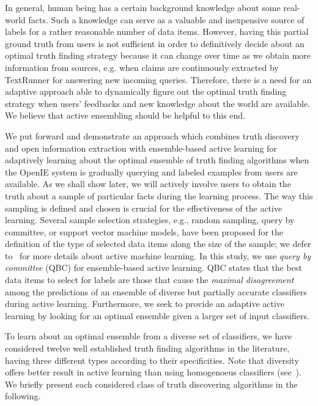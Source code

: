 In general, human being has a certain background knowledge about some real-world facts. Such a knowledge can serve as a valuable and inexpensive source of labels for a 
rather reasonable number of data items. However, having this partial ground truth from users is not sufficient in order to definitively decide about an optimal truth
finding strategy because it can change over time as we obtain more information from sources, e.g. when claims are continuously extracted by TextRunner for answering
new incoming queries. Therefore, there is a need for an adaptive approach able to dynamically figure out the optimal truth finding strategy when users' feedbacks and 
new knowledge about the world are available. We believe that active ensembling should be helpful to this end.

We put forward and demonstrate an approach which combines truth discovery and open information extraction with ensemble-based active learning for adaptively learning about the optimal 
ensemble of truth finding algorithms when the OpenIE system is gradually querying and labeled examples from users are available.
As we shall show later, we will actively involve users to obtain the truth about a sample of particular facts during the learning process. The way this sampling is defined and
chosen is crucial for the effectiveness of the active learning. Several sample selection strategies, e.g., random sampling, query by committee, or support vector machine models,
have been proposed for the definition of the type of selected data items along the size of the sample; we defer to~\cite{burr12} for more details about active machine learning.
In this study, we use \emph{query by committee} (QBC) for ensemble-based active learning. QBC states that the best data items to select for labels are those that cause 
the \emph{maximal disagreement} among the predictions of an ensemble of diverse but partially accurate classifiers during active learning. Furthermore, we seek to provide
an adaptive active learning by looking for an optimal ensemble given a larger set of input classifiers.

To learn about an optimal ensemble from a diverse set of classifiers, we have considered
twelve well established truth finding algorithms in the literature, having three different types 
according to their specificities. Note that diversity offers better result in active learning than
using homogenoeus classifiers (see~\cite{Lu15}). We briefly present each considered class of truth
discovering algorithms in the following.

